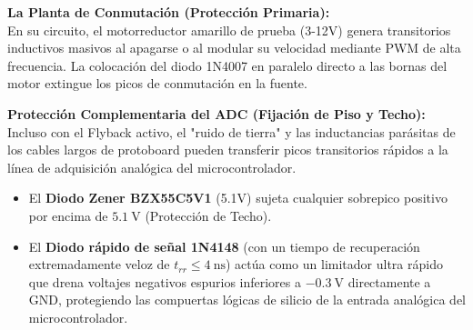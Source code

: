 \documentclass[11pt, a4paper]{article}
\begin{document}
\vspace{0.4cm}
\begin{center}
\end{center}
\vspace{0.4cm}

\textbf{La Planta de Conmutación (Protección Primaria):}\\
En su circuito, el motorreductor amarillo de prueba (3-12V) genera transitorios inductivos masivos al apagarse o al modular su velocidad mediante PWM de alta frecuencia. La colocación del diodo 1N4007 en paralelo directo a las bornas del motor extingue los picos de conmutación en la fuente.

\textbf{Protección Complementaria del ADC (Fijación de Piso y Techo):}\\
Incluso con el Flyback activo, el "ruido de tierra" y las inductancias parásitas de los cables largos de protoboard pueden transferir picos transitorios rápidos a la línea de adquisición analógica del microcontrolador.
\begin{itemize}
    \item El \textbf{Diodo Zener BZX55C5V1} (5.1V) sujeta cualquier sobrepico positivo por encima de $\qty{5.1}{\volt}$ (Protección de Techo).
    \item El \textbf{Diodo rápido de señal 1N4148} (con un tiempo de recuperación extremadamente veloz de $t_{rr} \le \qty{4}{\nano\second}$) actúa como un limitador ultra rápido que drena voltajes negativos espurios inferiores a $\qty{-0.3}{\volt}$ directamente a GND, protegiendo las compuertas lógicas de silicio de la entrada analógica del microcontrolador.
\end{itemize}
\end{document}
